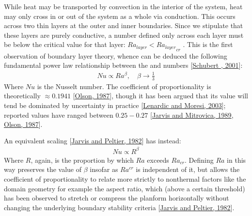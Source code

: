 \documentclass[letterpaper,10pt,english]{jupyterBook}
\begin{document}
\sphinxAtStartPar
While heat may be transported by convection in the interior of the system, heat may only cross in or out of the system as a whole via conduction. This occurs across two thin layers at the outer and inner boundaries. Since we stipulate that these layers are purely conductive, a  number defined only across each layer must be below the critical value for that layer: \({Ra}_{layer} < {{Ra}_{layer}}_{cr}\) . This is the first observation of boundary layer theory, whence can be deduced the following fundamental power law relationship between the  and  numbers {[}\hyperlink{cite.references:id663}{Schubert , 2001}{]}:
\begin{equation*}
\begin{split} Nu \propto Ra^{\beta}, \quad \beta \to \frac{1}{3} \end{split}
\end{equation*}
\sphinxAtStartPar
Where \(Nu\) is the Nusselt number. The coefficient of proportionality is theoretically \(\approx 0.1941\) {[}\hyperlink{cite.references:id761}{Olson, 1987}{]}, though it has been argued that its value will tend be dominated by uncertainty in practice {[}\hyperlink{cite.references:id868}{Lenardic and Moresi, 2003}{]}; reported values have ranged between \(0.25-0.27\) {[}\hyperlink{cite.references:id913}{Jarvis and Mitrovica, 1989}, \hyperlink{cite.references:id761}{Olson, 1987}{]}.

\sphinxAtStartPar
An equivalent scaling {[}\hyperlink{cite.references:id882}{Jarvis and Peltier, 1982}{]} has instead:
\begin{equation*}
\begin{split} Nu \propto R^{\beta} \end{split}
\end{equation*}
\sphinxAtStartPar
Where \(R\), again, is the proportion by which \(Ra\) exceeds \(Ra_{cr}\). Defining \(Ra\) in this way preserves the value of \(\beta\) insofar as \(Ra^{cr}\) is independent of it, but allows the coefficient of proportionality to relate more strictly to non\sphinxhyphen{}thermal factors like the domain geometry \sphinxhyphen{} for example the aspect ratio, which (above a certain threshold) has been observed to stretch or compress the planform horizontally without changing the underlying boundary stability criteria {[}\hyperlink{cite.references:id882}{Jarvis and Peltier, 1982}{]}.
\end{document}
